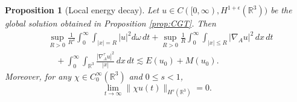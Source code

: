 \documentclass[10pt%
]{amsart}
\numberwithin{equation}{section}
\newcommand{\R}{\mathbb{R}}
\newtheorem{proposition}[theorem]{Proposition}
\theoremstyle{definition}
\begin{document}
\begin{proposition}[Local energy decay]\label{prop:uniformenergy} Let $u\in C([0,\infty),H^{1+\epsilon}(\R^3))$ be the global solution obtained in Proposition \ref{prop:CGT}. Then
	\begin{align}
		\label{equ:locmasdec}
		&\sup_{R>0}\frac{1}{R^2}\int_0^\infty\int_{|x|=R}|u|^2d\omega\,dt+\sup_{R>0}\frac{1}{R}\int_0^\infty\int_{|x|\le R}|{\nabla_A u}|^2\,dx\,dt\\\nonumber&\quad +\int_0^\infty\int_{\R^3}\frac{|\nabla_A^\tau u|^2}{|x|}\,dx\,dt\lesssim   E(u_0)+M(u_0). 
	\end{align}
	Moreover, for any $\chi\in C_0^\infty(\R^3)$ and $0\le s<1$, 
	\begin{equation}\label{equ:locenedecHs}
		\lim_{t\to\infty}\|\chi u(t)\|_{H^s(\R^3)}=0.
	\end{equation}
\end{proposition}
\end{document}
